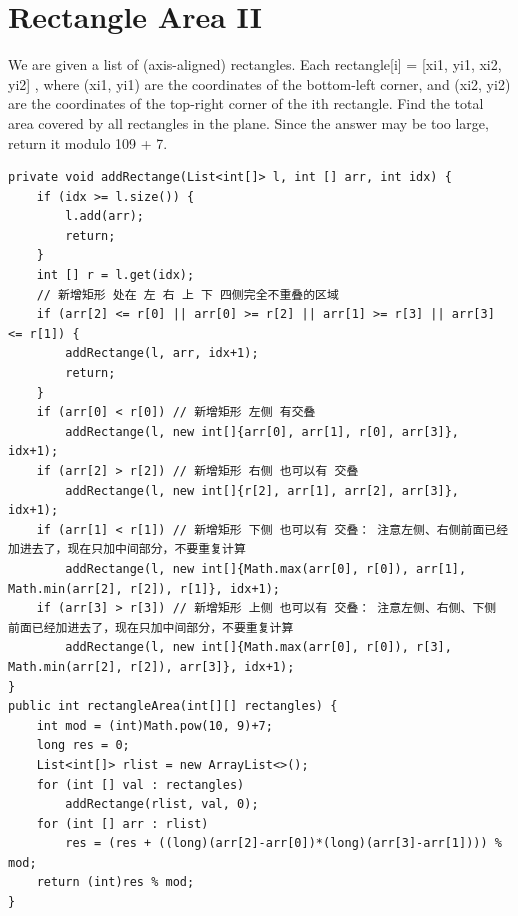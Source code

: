 \documentclass[9pt, b5paaper]{book}
\begin{document}
\section{Rectangle Area II}
\label{sec-11-2}
We are given a list of (axis-aligned) rectangles. Each rectangle[i] = [xi1, yi1, xi2, yi2] , where (xi1, yi1) are the coordinates of the bottom-left corner, and (xi2, yi2) are the coordinates of the top-right corner of the ith rectangle.
Find the total area covered by all rectangles in the plane. Since the answer may be too large, return it modulo 109 + 7.
\begin{verbatim}
private void addRectange(List<int[]> l, int [] arr, int idx) {
    if (idx >= l.size()) {
        l.add(arr);
        return;
    }
    int [] r = l.get(idx);
    // 新增矩形 处在 左 右 上 下 四侧完全不重叠的区域
    if (arr[2] <= r[0] || arr[0] >= r[2] || arr[1] >= r[3] || arr[3] <= r[1]) { 
        addRectange(l, arr, idx+1);
        return;
    }
    if (arr[0] < r[0]) // 新增矩形 左侧 有交叠
        addRectange(l, new int[]{arr[0], arr[1], r[0], arr[3]}, idx+1);
    if (arr[2] > r[2]) // 新增矩形 右侧 也可以有 交叠
        addRectange(l, new int[]{r[2], arr[1], arr[2], arr[3]}, idx+1);
    if (arr[1] < r[1]) // 新增矩形 下侧 也可以有 交叠： 注意左侧、右侧前面已经加进去了，现在只加中间部分，不要重复计算
        addRectange(l, new int[]{Math.max(arr[0], r[0]), arr[1], Math.min(arr[2], r[2]), r[1]}, idx+1);
    if (arr[3] > r[3]) // 新增矩形 上侧 也可以有 交叠： 注意左侧、右侧、下侧 前面已经加进去了，现在只加中间部分，不要重复计算
        addRectange(l, new int[]{Math.max(arr[0], r[0]), r[3], Math.min(arr[2], r[2]), arr[3]}, idx+1);
}
public int rectangleArea(int[][] rectangles) {
    int mod = (int)Math.pow(10, 9)+7;
    long res = 0;
    List<int[]> rlist = new ArrayList<>();
    for (int [] val : rectangles) 
        addRectange(rlist, val, 0);
    for (int [] arr : rlist) 
        res = (res + ((long)(arr[2]-arr[0])*(long)(arr[3]-arr[1]))) % mod;
    return (int)res % mod;
}
\end{verbatim}
\end{document}
